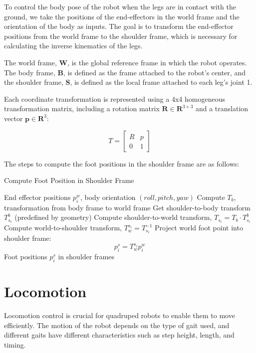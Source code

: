 \documentclass[a4paper,11pt]{article}
\begin{document}
To control the body pose of the robot when the legs are in contact with the ground, we take
the positions of the end-effectors in the world frame and the orientation of the body as inputs.
The goal is to transform the end-effector positions from the world frame to the shoulder frame, which is necessary for
calculating the inverse kinematics of the legs.

The world frame, $\boldsymbol{W}$, is the global reference frame in which the robot operates. 
The body frame, $\boldsymbol{B}$, is defined as the frame attached to the robot's center, and 
the shoulder frame, $\boldsymbol{S}$, is defined as the local frame attached to each leg's joint 1.

Each coordinate transformation is represented using a 4x4 homogeneous transformation matrix, including a rotation matrix $\mathbf{R} \in \mathbf{R}^{3 \times 3}$
and a translation vector $\mathbf{p} \in \mathbf{R}^{3}$:

$$
T = \begin{bmatrix}
R & p \\
0 & 1
\end{bmatrix}
$$

The steps to compute the foot positions in the shoulder frame are as follows:

\begin{algorithm}[H]
\caption{Compute Foot Position in Shoulder Frame}
\begin{algorithmic}[1]
\Require End effector positions $p^w_i$, body orientation $(roll, pitch, yaw)$
\State Compute $T_b$, transformation from body frame to world frame
    \State Get shoulder-to-body transform $T_{s_i}^b$ (predefined by geometry)
    \State Compute shoulder-to-world transform, $T_{s_i} = T_b \cdot T_{s_i}^b$
    \State Compute world-to-shoulder transform, $T_w^{s_i} = T_{s_i}^{-1}$
    \State Project world foot point into shoulder frame:
    $$
    p_i^s = T_w^{s_i} p_i^w
    $$
\EndFor
\State \Return Foot positions $p_i^s$ in shoulder frames
\end{algorithmic}
\end{algorithm}

\section*{Locomotion}

Locomotion control is crucial for quadruped robots to enable them to move efficiently. The motion of the robot depends on the type of gait used, and different gaits have different characteristics such as step height, length, and timing.
\end{document}

